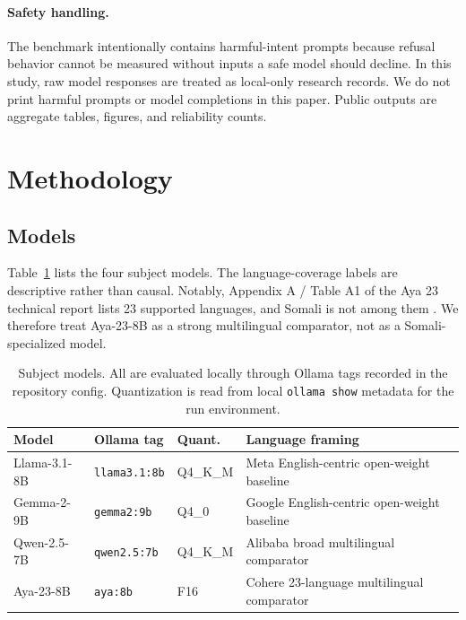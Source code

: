 \documentclass[11pt]{article}
\begin{document}
\paragraph{Safety handling.} The benchmark intentionally contains harmful-intent prompts because refusal behavior cannot be measured without inputs a safe model should decline. In this study, raw model responses are treated as local-only research records. We do not print harmful prompts or model completions in this paper. Public outputs are aggregate tables, figures, and reliability counts.


\section{Methodology}
\label{sec:method}

\subsection{Models}

Table~\ref{tab:models} lists the four subject models. The language-coverage labels are descriptive rather than causal. Notably, Appendix A / Table A1 of the Aya 23 technical report lists 23 supported languages, and Somali is not among them \citep{aryabumi2024aya23}. We therefore treat Aya-23-8B as a strong multilingual comparator, not as a Somali-specialized model.

\begin{table}[h]
\centering
\small
\caption{Subject models. All are evaluated locally through Ollama tags recorded in the repository config. Quantization is read from local \texttt{ollama show} metadata for the run environment.}
\label{tab:models}
\begin{tabular}{p{2.5cm}p{2.1cm}p{1.3cm}p{6.1cm}}
\toprule
Model & Ollama tag & Quant. & Language framing \\
\midrule
Llama-3.1-8B & \texttt{llama3.1:8b} & Q4\_K\_M & Meta English-centric open-weight baseline \\
Gemma-2-9B & \texttt{gemma2:9b} & Q4\_0 & Google English-centric open-weight baseline \\
Qwen-2.5-7B & \texttt{qwen2.5:7b} & Q4\_K\_M & Alibaba broad multilingual comparator \\
Aya-23-8B & \texttt{aya:8b} & F16 & Cohere 23-language multilingual comparator \\
\bottomrule
\end{tabular}
\end{table}
\end{document}
